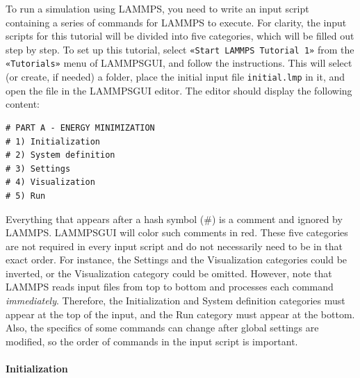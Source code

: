 \documentclass[9pt,tutorial]{livecoms}
\newcommand{\lmpcmd}[1]{\hspace{0pt}\colorbox{listing}{\textcolor{command}{\small{#1}}}\hspace{0pt}} %
\newcommand{\flecmd}[1]{\textcolor{command}{\texttt{#1}}} %
\newcommand{\guicmd}[1]{\textcolor{command}{\texttt{«#1»}}} %
\newcommand{\lammpsgui}{\textsf{LAMMPS\textendash GUI}}
\begin{document}
To run a simulation using LAMMPS, you need to write an input script containing
a series of commands for LAMMPS to execute.  For clarity, the
input scripts for this tutorial will be divided into five categories,
which will be filled out step by step.  To set up this tutorial, select
\guicmd{Start LAMMPS Tutorial 1} from the \guicmd{Tutorials} menu of \lammpsgui{}, and
follow the instructions.  This will select (or create, if needed) a folder,
place the initial input file \flecmd{initial.lmp} in it, and
open the file in the \lammpsgui{} editor.  The editor should display the
following content:
\begin{lstlisting}
# PART A - ENERGY MINIMIZATION
# 1) Initialization
# 2) System definition
# 3) Settings
# 4) Visualization
# 5) Run
\end{lstlisting}
Everything that appears after a hash symbol ($\#$) is a comment
and ignored by LAMMPS.  \lammpsgui{} will color such comments in red.
These five categories are not required in every input script and do not
necessarily need to be in that exact order.  For instance, the \lmpcmd{Settings}
and the \lmpcmd{Visualization} categories could be inverted, or
the \lmpcmd{Visualization} category could be omitted.  However, note that
LAMMPS reads input files from top to bottom and processes each command
\emph{immediately}.  Therefore, the \lmpcmd{Initialization} and
\lmpcmd{System definition} categories must appear at the top of the
input, and the \lmpcmd{Run} category must appear at the bottom.  Also, the
specifics of some commands can change after global settings are modified, so the
order of commands in the input script is important.

\paragraph{Initialization}
\end{document}
